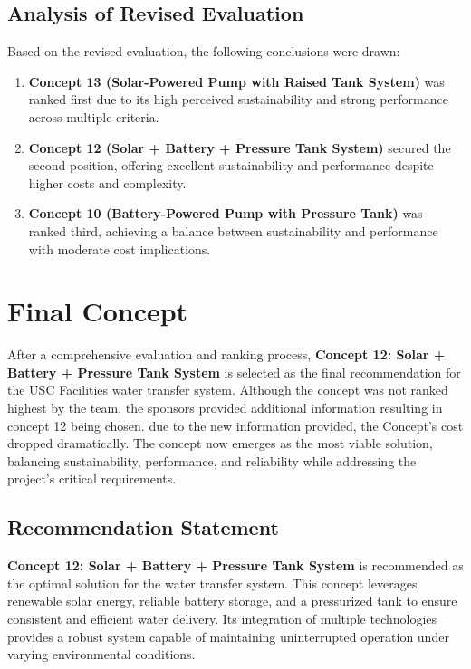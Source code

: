 \documentclass[12pt]{report}
\begin{document}
\subsection{Analysis of Revised Evaluation}

Based on the revised evaluation, the following conclusions were drawn:

\begin{enumerate}
    \item \textbf{Concept 13 (Solar-Powered Pump with Raised Tank System)} was ranked first due to its high perceived sustainability and strong performance across multiple criteria.
    \item \textbf{Concept 12 (Solar + Battery + Pressure Tank System)} secured the second position, offering excellent sustainability and performance despite higher costs and complexity.
    \item \textbf{Concept 10 (Battery-Powered Pump with Pressure Tank)} was ranked third, achieving a balance between sustainability and performance with moderate cost implications.
\end{enumerate}


\section{Final Concept}
\label{sec:final_concept}

After a comprehensive evaluation and ranking process, \textbf{Concept 12: Solar + Battery + Pressure Tank System} is selected as the final recommendation for the USC Facilities water transfer system. Although the concept was not ranked highest by the team, the sponsors provided additional information resulting in concept 12 being chosen. due to the new information provided, the Concept's cost dropped dramatically. The concept now emerges as the most viable solution, balancing sustainability, performance, and reliability while addressing the project's critical requirements.

\subsection{Recommendation Statement}

\textbf{Concept 12: Solar + Battery + Pressure Tank System} is recommended as the optimal solution for the water transfer system. This concept leverages renewable solar energy, reliable battery storage, and a pressurized tank to ensure consistent and efficient water delivery. Its integration of multiple technologies provides a robust system capable of maintaining uninterrupted operation under varying environmental conditions.
\end{document}
